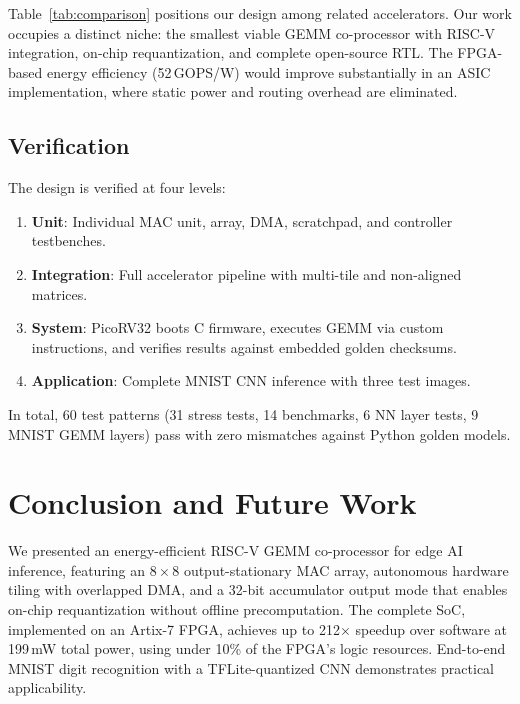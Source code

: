 \documentclass[conference]{IEEEtran}
\begin{document}
Table~\ref{tab:comparison} positions our design among related accelerators. Our work occupies a distinct niche: the smallest viable GEMM co-processor with RISC-V integration, on-chip requantization, and complete open-source RTL. The FPGA-based energy efficiency (52\,GOPS/W) would improve substantially in an ASIC implementation, where static power and routing overhead are eliminated.

\subsection{Verification}

The design is verified at four levels:
\begin{enumerate}
    \item \textbf{Unit}: Individual MAC unit, array, DMA, scratchpad, and controller testbenches.
    \item \textbf{Integration}: Full accelerator pipeline with multi-tile and non-aligned matrices.
    \item \textbf{System}: PicoRV32 boots C firmware, executes GEMM via custom instructions, and verifies results against embedded golden checksums.
    \item \textbf{Application}: Complete MNIST CNN inference with three test images.
\end{enumerate}

In total, 60 test patterns (31 stress tests, 14 benchmarks, 6 NN layer tests, 9 MNIST GEMM layers) pass with zero mismatches against Python golden models.

\section{Conclusion and Future Work}
\label{sec:conclusion}

We presented an energy-efficient RISC-V GEMM co-processor for edge AI inference, featuring an $8\times8$ output-stationary MAC array, autonomous hardware tiling with overlapped DMA, and a 32-bit accumulator output mode that enables on-chip requantization without offline precomputation. The complete SoC, implemented on an Artix-7 FPGA, achieves up to 212$\times$ speedup over software at 199\,mW total power, using under 10\% of the FPGA's logic resources. End-to-end MNIST digit recognition with a TFLite-quantized CNN demonstrates practical applicability.
\end{document}
